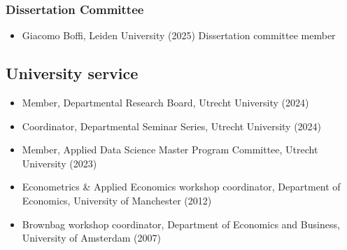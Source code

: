 \documentclass[11pt]{article}
\begin{document}
\subsubsection*{Dissertation Committee}

\begin{itemize}[leftmargin=20pt]
    \itemsep-.1cm
    \item[]  Giacomo Boffi, Leiden University (2025) Dissertation committee member
\end{itemize}


\subsection*{\sc University service}
\begin{itemize}[leftmargin=20pt]
    \itemsep-.1cm
    \item[] Member, Departmental Research Board, Utrecht University (2024\textendash)
    \item[] Coordinator, Departmental Seminar Series, Utrecht University (2024\textendash)
    \item[] Member, Applied Data Science Master Program Committee, Utrecht University (2023\textendash)
    \item[] Econometrics \& Applied Economics workshop coordinator, Department of Economics, University of Manchester (2012)
    \item[] Brownbag workshop coordinator, Department of Economics and Business, University of Amsterdam (2007)
\end{itemize}
\end{document}
